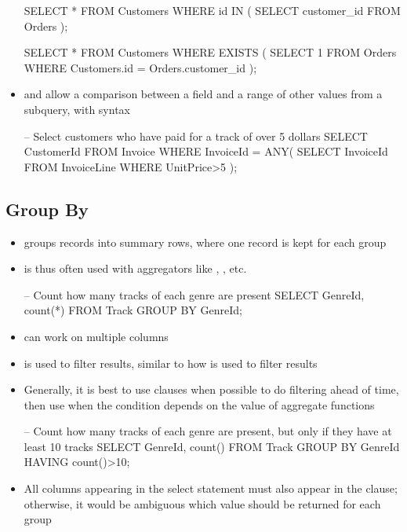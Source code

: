 \documentclass[a4paper]{article}
\begin{document}
\begin{itemize}
\begin{arrows}
\begin{sql}
SELECT * FROM Customers
WHERE id IN (
    SELECT customer_id FROM Orders
);
\end{sql}
\begin{sql}
SELECT * FROM Customers
WHERE EXISTS (
    SELECT 1 FROM Orders
    WHERE Customers.id = Orders.customer_id
);
\end{sql}

\end{arrows}
\item {} and  allow a comparison between a field and a range of other values from a subquery, with syntax 
\begin{sql}
-- Select customers who have paid for a track of over 5 dollars
SELECT CustomerId FROM Invoice
WHERE InvoiceId = ANY(
    SELECT InvoiceId FROM InvoiceLine
    WHERE UnitPrice>5
);
\end{sql}
\end{itemize}

\subsection{Group By}
\begin{itemize}
    \item {} groups records into summary rows, where one record is kept for each group
    \item {} is thus often used with aggregators like , , etc.
\begin{sql}
-- Count how many tracks of each genre are present
SELECT GenreId, count(*)
FROM Track
GROUP BY GenreId;
\end{sql}
    \item {} can work on multiple columns
    \item {} is used to filter  results, similar to how  is used to filter  results
    \item Generally, it is best to use  clauses when possible to do filtering ahead of time, then use  when the condition depends on the value of aggregate functions
\begin{sql}
-- Count how many tracks of each genre are present, but only if they have at least 10 tracks
SELECT GenreId, count()
FROM Track
GROUP BY GenreId
HAVING count()>10;
\end{sql}
\item All columns appearing in the select statement must also appear in the  clause; otherwise, it would be ambiguous which value should be returned for each group
\end{itemize}
\end{document}
